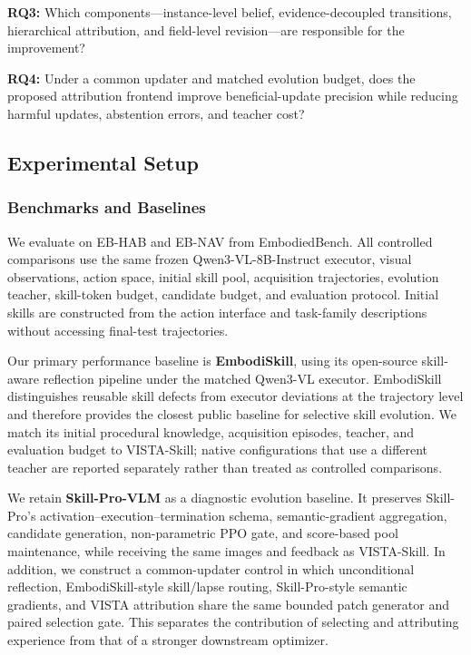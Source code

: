 \textbf{RQ3:} Which components---instance-level belief, evidence-decoupled transitions, hierarchical attribution, and field-level revision---are responsible for the improvement?

\textbf{RQ4:} Under a common updater and matched evolution budget, does the proposed attribution frontend improve beneficial-update precision while reducing harmful updates, abstention errors, and teacher cost?




\subsection{Experimental Setup}
\label{sec:experimental_setup}

\subsubsection{Benchmarks and Baselines}
\label{sec:benchmarks_baselines}

We evaluate on EB-HAB and EB-NAV from EmbodiedBench\cite{yangEmbodiedBenchComprehensiveBenchmarking2025}. All controlled comparisons use the same frozen Qwen3-VL-8B-Instruct executor, visual observations, action space, initial skill pool, acquisition trajectories, evolution teacher, skill-token budget, candidate budget, and evaluation protocol. Initial skills are constructed from the action interface and task-family descriptions without accessing final-test trajectories.

Our primary performance baseline is \textbf{EmbodiSkill}, using its open-source skill-aware reflection pipeline under the matched Qwen3-VL executor. EmbodiSkill distinguishes reusable skill defects from executor deviations at the trajectory level and therefore provides the closest public baseline for selective skill evolution. We match its initial procedural knowledge, acquisition episodes, teacher, and evaluation budget to VISTA-Skill; native configurations that use a different teacher are reported separately rather than treated as controlled comparisons.

We retain \textbf{Skill-Pro-VLM} as a diagnostic evolution baseline. It preserves Skill-Pro's activation--execution--termination schema, semantic-gradient aggregation, candidate generation, non-parametric PPO gate, and score-based pool maintenance, while receiving the same images and feedback as VISTA-Skill. In addition, we construct a common-updater control in which unconditional reflection, EmbodiSkill-style skill/lapse routing, Skill-Pro-style semantic gradients, and VISTA attribution share the same bounded patch generator and paired selection gate. This separates the contribution of selecting and attributing experience from that of a stronger downstream optimizer.

